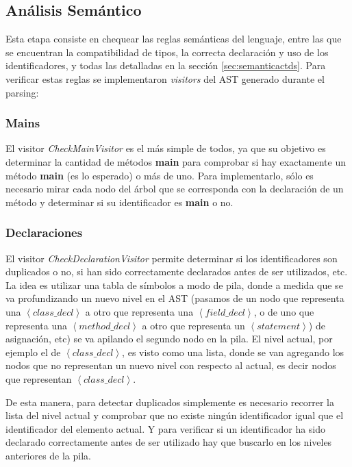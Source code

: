 \documentclass[11pt,a4paper]{article}
\begin{document}
\subsection{Análisis Semántico} 
\label{subsec:semantico}

Esta etapa consiste en chequear las reglas semánticas del lenguaje, entre las que se encuentran la compatibilidad de tipos, la correcta declaración y uso de los identificadores, y todas las detalladas en la sección \ref{sec:semanticactds}. Para verificar estas reglas se implementaron \textit{visitors} del AST generado durante el parsing: 

\subsubsection{Mains}
\label{mains}
El visitor \textit{CheckMainVisitor} es el más simple de todos, ya que su objetivo es determinar la cantidad de métodos \textbf{main} para comprobar si hay exactamente un método \textbf{main} (es lo esperado) o más de uno. Para implementarlo, sólo es necesario mirar cada nodo del árbol que se corresponda con la declaración de un método y determinar si su identificador es \textbf{main} o no.
 
\subsubsection{Declaraciones}
\label{subsec:decls}

El visitor \textit{CheckDeclarationVisitor} permite determinar si los identificadores son duplicados o no, si han sido correctamente declarados antes de ser utilizados, etc. La idea es utilizar una tabla de símbolos a modo de pila, donde a medida que se va profundizando un nuevo nivel en el AST (pasamos de  un nodo que representa una $\left\langle class\_decl \right\rangle$ a otro que representa una $\left\langle field\_decl \right\rangle$, o de uno que representa una $\left\langle method\_decl \right\rangle$ a otro que representa un $\left\langle statement \right\rangle$) de asignación, etc) se va apilando el segundo nodo en la pila. El nivel actual, por ejemplo el de $\left\langle class\_decl \right\rangle$, es visto como una lista, donde se van agregando los nodos que no representan un nuevo nivel con respecto al actual, es decir nodos que representan $\left\langle class\_decl \right\rangle$. 

De esta manera, para detectar duplicados simplemente es necesario recorrer la lista del nivel actual y comprobar que no existe ningún identificador igual que el identificador del elemento actual. Y para verificar si un identificador ha sido declarado correctamente antes de ser utilizado hay que buscarlo en los niveles anteriores de la pila. 
\end{document}
